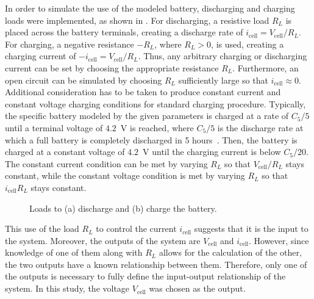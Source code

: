 \documentclass[../zhang_thesis.tex]{subfiles}
\begin{document}
In order to simulate the use of the modeled battery, discharging and charging loads were implemented, as shown in . For discharging, a resistive load $R_L$ is placed across the battery terminals, creating a discharge rate of $i_\text{cell}=V_\text{cell}/R_L$. For charging, a negative resistance $-R_L$, where $R_L>0$, is used, creating a charging current of $-i_\text{cell}=V_\text{cell}/R_L$. Thus, any arbitrary charging or discharging current can be set
by choosing the appropriate resistance $R_L$. Furthermore, an open circuit can be simulated by choosing $R_L$ sufficiently large so that $i_\text{cell}\approx 0$. Additional consideration has to be taken to produce constant current and constant voltage charging conditions for standard charging procedure. Typically, the specific battery modeled by the given parameters is charged at a rate of $C_5/5$ until a terminal voltage of $4.2$~V is reached, where $C_5/5$ is the discharge
rate at which a full battery is completely discharged in 5 hours~\cite{linden01_ch3}. Then, the battery is charged at a constant voltage of $4.2$~V until the charging current is below $C_5/20$. The constant current condition can be met by varying $R_L$ so that $V_\text{cell}/R_L$ stays constant, while the constant voltage condition is met by varying $R_L$ so that $i_\text{cell} R_L$ stays constant.

\begin{figure}[ht]
\centering
\begin{subfigure}[c]{0.4\textwidth}
    
\end{subfigure}
\begin{subfigure}[c]{0.55\textwidth}
    
\end{subfigure}
\caption{Loads to (a) discharge and (b) charge the battery.}
\label{fig:batt_loads}
\end{figure}

This use of the load $R_L$ to control the current $i_\text{cell}$ suggests that it is the input to the system. Moreover, the outputs of the system are $V_\text{cell}$ and $i_\text{cell}$. However, since knowledge of one of them along with $R_L$ allows for the calculation of the other, the two outputs have a known relationship between them. Therefore, only one of the outputs is necessary to fully define the input-output relationship of the system. In this study, the voltage
$V_\text{cell}$ was chosen as the output.
\end{document}
